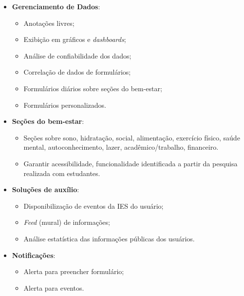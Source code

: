 \begin{itemize}

    \item \textbf{Gerenciamento de Dados}:

    \begin{itemize}

        \item Anotações livres;

        \item Exibição em gráficos e \textit{dashboards};

        \item Análise de confiabilidade dos dados;

        \item Correlação de dados de formulários;

        \item Formulários diários sobre seções do bem-estar;

        \item Formulários personalizados.

    \end{itemize}

    \item \textbf{Seções do bem-estar}:

    \begin{itemize}

        \item Seções sobre sono, hidratação, social, alimentação, exercício físico, saúde mental, autoconhecimento, lazer, acadêmico/trabalho, financeiro.

        \item Garantir acessibilidade, funcionalidade identificada a partir da pesquisa realizada com estudantes.

    \end{itemize}

    \item \textbf{Soluções de auxílio}:

    \begin{itemize}

        \item Disponibilização de eventos da IES do usuário;

        \item \textit{Feed} (mural) de informações;

        \item Análise estatística das informações públicas dos usuários.

    \end{itemize}

    \item \textbf{Notificações}:

    \begin{itemize}

        \item Alerta para preencher formulário;

        \item Alerta para eventos.

    \end{itemize}

\end{itemize}


